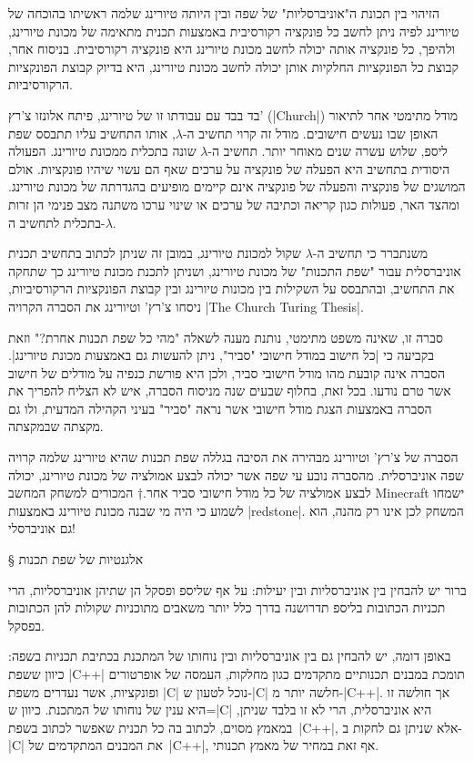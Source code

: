 הזיהוי בין תכונת ה"אוניברסליות" של שפה ובין היותה טיורינג שלמה ראשיתו בהוכחה של
טיורינג לפיה ניתן לחשב כל פונקציה רקורסיבית באמצעות תכנית מתאימה של מכונת
טיורינג, ולהיפך, כל פונקציה אותה יכולה לחשב מכונת טיורינג היא פונקציה
רקורסיבית. בניסוח אחר, קבוצת כל הפונקציות החלקיות אותן יכולה לחשב מכונת
טיורינג, היא בדיוק קבוצת הפונקציות הרקורסיביות.

בד בבד עם עבודתו זו של טיורינג, פיתח אלונזו צ'רץ' (\E|Church|) מודל
מתימטי אחר לתיאור האופן שבו נעשים חישובים. מודל זה קרוי תחשיב ה-$λ$, אותו
התחשיב עליו תתבסס שפת ליספ, שלוש עשרה שנים מאוחר יותר. תחשיב ה-$λ$ שונה בתכלית
ממכונת טיורינג. הפעולה היסודית בתחשיב היא הפעלה של פונקציה על ערכים שאף הם עשוי
שיהיו פונקציות. אולם המושגים של פונקציה והפעלה של פונקציה אינם קיימים מופיעים
בהגדרתה של מכונת טיורינג. ומהצד האר, פעולות כגון קריאה וכתיבה של ערכים או שינוי
ערכו משתנה מצב פנימי הן זרות בתכלית לתחשיב ה-$λ$.

משנתברר כי תחשיב ה-$λ$ שקול למכונת טיורינג, במובן זה שניתן לכתוב בתחשיב תכנית
אוניברסלית עבור "שפת התכנות" של מכונת טיורינג, ושניתן לתכנת מכונת טיורינג כך
שתחקה את התחשיב, ובהתבסס על השקילות בין מכונות טיורינג ובין קבוצת הפונקציות
הרקורסיביות, ניסחו צ'רץ' וטיורינג את הסברה הקרויה \E|The Church Turing Thesis|.

סברה זו, שאינה משפט מתימטי, נותנת מענה לשאלה "מהי כל שפת תכנות אחרת?" וזאת
בקביעה כי \ע|כל חישוב במודל חישובי "סביר", ניתן להעשות גם באמצעות מכונת
טיורינג|. הסברה אינה קובעת מהו מודל חישובי סביר, ולכן היא פורשת כנפיה על
מודלים של חישוב אשר טרם נודעו. בכל זאת, בחלוף שבעים שנה מניסוח הסברה,
איש לא הצליח להפריך את הסברה באמצעות הצגת מודל חישובי אשר נראה "סביר"
בעיני הקהילה המדעית, ולו גם מקצתה שבמקצתה.

הסברה של צ'רץ' וטיורינג מבהירה את הסיבה בגללה שפת תכנות שהיא טיורינג שלמה קרויה
שפה אוניברסלית. מהסברה נובע עי שפה אשר יכולה לבצע אמולציה של מכונת טיורינג,
יכולה לבצע אמולציה של כל מודל חישובי סביר אחר.†{%
  המכורים למשחק המחשב Minecraft ישמחו לשמוע כי היה מי שבנה מכונת טיורינג
  באמצעות \E|redstone|. המשחק לכן אינו רק מהנה, הוא גם אוניברסלי!}

§ אלגנטיות של שפת תכנות

ברור יש להבחין בין אוניברסליות ובין יעילות: על אף שליספ ופסקל הן שתיהן
אוניברסליות, הרי תכניות הכתובות בליספ תדרושנה בדרך כלל יותר משאבים מתוכניות
שקולות להן הכתובות בפסקל.

באופן דומה, יש להבחין גם בין אוניברסליות ובין נוחותו של המתכנת בכתיבת תכניות
בשפה: כיוון ששפת \E|C++| תומכת במבנים תכנותיים מתקדמים כגון מחלקות, העמסה של
אופרטורים ופונקציות, אשר נעדרים משפת \E|C| נוכל לטעון ש-\E|C| חלשה יותר
מ-\E|C++|. אך חולשה זו היא ענין של נוחותו של המתכנת. כיוון ש=\E|C| היא
אוניברסלית, הרי לא זו בלבד שניתן, במאמץ מסוים, לכתוב בה כל תכנית שאפשר לכתוב
בשפת~\E|C++|, אלא שניתן גם לחקות ב-\E|C| את המבנים המתקדמים של~\E|C++|, אף זאת
במחיר של מאמץ תכנותי.

